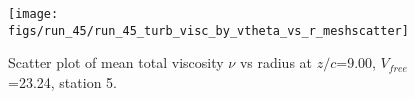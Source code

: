 \begin{figure}[H]
\centering
\texttt{[image: figs/run\_45/run\_45\_turb\_visc\_by\_vtheta\_vs\_r\_meshscatter]}
\caption{Scatter plot of mean total viscosity $\nu$ vs radius at $z/c$=9.00, $V_{free}$=23.24, station 5.}
\label{fig:run_45_turb_visc_by_vtheta_vs_r_meshscatter}
\end{figure}


